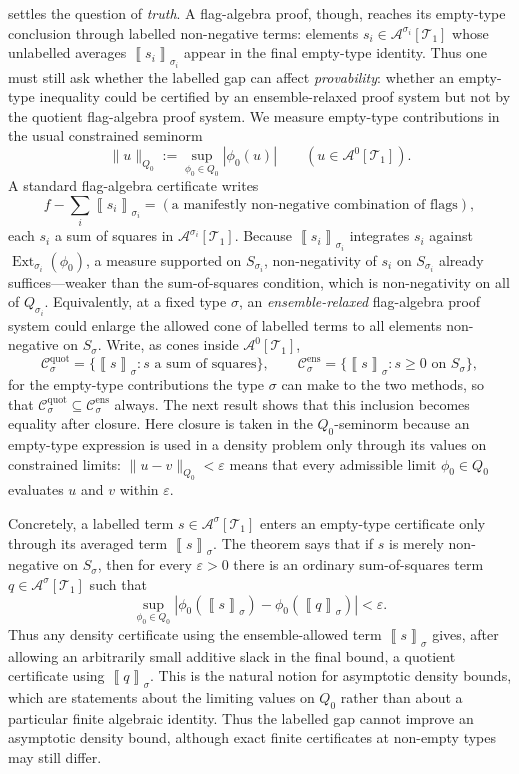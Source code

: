 \documentclass[11pt]{article}
\theoremstyle{definition}
\newcommand{\A}{\mathcal{A}}
\newcommand{\T}{\mathcal{T}}
\newcommand{\C}{\mathcal{C}}
\newcommand{\Ext}{\operatorname{Ext}}
\newcommand{\avg}[2]{\left\llbracket #1 \right\rrbracket_{#2}}
\newcommand{\eps}{\varepsilon}
\begin{document}
 settles the question of \emph{truth}.  A flag-algebra proof, though,
reaches its empty-type conclusion through labelled non-negative terms: elements
$s_i\in\A^{\sigma_i}[\T_1]$ whose unlabelled averages $\avg{s_i}{\sigma_i}$ appear in
the final empty-type identity.  Thus one must still ask
whether the labelled gap can affect \emph{provability}: whether an empty-type inequality
could be certified by an ensemble-relaxed proof system but not by the quotient
flag-algebra proof system.  We measure empty-type contributions in the usual constrained seminorm
\[
  \|u\|_{Q_0}:=\sup_{\phi_0\in Q_0}|\phi_0(u)|
  \qquad (u\in\A^0[\T_1]).
\]
A standard flag-algebra certificate writes
\[
  f-\sum_i\avg{s_i}{\sigma_i}=(\text{a manifestly non-negative combination of flags}),
\]
each $s_i$ a sum of squares in $\A^{\sigma_i}[\T_1]$.  Because $\avg{s_i}{\sigma_i}$
integrates $s_i$ against $\Ext_{\sigma_i}(\phi_0)$, a measure supported on
$S_{\sigma_i}$, non-negativity of $s_i$ on $S_{\sigma_i}$ already suffices---weaker than
the sum-of-squares condition, which is non-negativity on all of $Q_{\sigma_i}$.
Equivalently, at a fixed type $\sigma$, an \emph{ensemble-relaxed} flag-algebra proof
system could enlarge the allowed cone of labelled terms to all elements non-negative on
$S_\sigma$.  Write, as cones inside $\A^0[\T_1]$,
\[
  \C^{\mathrm{quot}}_\sigma=\{\avg{s}{\sigma}:s\text{ a sum of squares}\},
  \qquad
  \C^{\mathrm{ens}}_\sigma=\{\avg{s}{\sigma}:s\ge0\text{ on }S_\sigma\},
\]
for the empty-type contributions the type $\sigma$ can make to the two methods, so that
$\C^{\mathrm{quot}}_\sigma\subseteq\C^{\mathrm{ens}}_\sigma$ always.  The next result
shows that this inclusion becomes equality after closure.  Here closure is taken in the
$Q_0$-seminorm because an empty-type expression is used in a density problem only through
its values on constrained limits: $\|u-v\|_{Q_0}<\eps$ means that every admissible limit
$\phi_0\in Q_0$ evaluates $u$ and $v$ within $\eps$.

Concretely, a labelled term $s\in\A^\sigma[\T_1]$ enters an empty-type certificate only
through its averaged term $\avg{s}{\sigma}$.  The theorem says that if
$s$ is merely non-negative on $S_\sigma$, then for every $\eps>0$ there is an ordinary
sum-of-squares term $q\in\A^\sigma[\T_1]$ such that
\[
  \sup_{\phi_0\in Q_0}
  \left|
    \phi_0\!\left(\avg{s}{\sigma}\right)
    -
    \phi_0\!\left(\avg{q}{\sigma}\right)
  \right|
  <\eps .
\]
Thus any density certificate using the ensemble-allowed term $\avg{s}{\sigma}$ gives,
after allowing an arbitrarily small additive slack in the final bound, a quotient
certificate using $\avg{q}{\sigma}$.  This is the natural notion for asymptotic density
bounds, which are statements about the limiting values on $Q_0$ rather than about a
particular finite algebraic identity.  Thus the labelled gap cannot improve an
asymptotic density bound, although exact finite certificates at non-empty types may still
differ.
\end{document}
